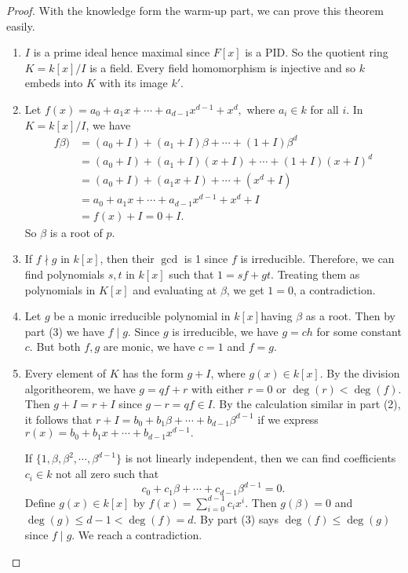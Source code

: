 \documentclass[12pt]{report}
\theoremstyle{definition}
\begin{document}
\begin{proof}
	With the knowledge form the warm-up part, we can prove this theorem easily.
	\begin{enumerate}
		\item  $I$ is a prime ideal hence maximal since $F[x]$ is a PID. So the quotient ring $K=k[x]/I$ is a field. Every field homomorphism is injective and so $k$ embeds into $K$ with its image $k'$.
		\item Let $f(x)= a_0+a_1x+\cdots+a_{d-1}x^{d-1}+x^d,$ where $a_i\in k$ for all $i$. In $K=k[x]/I$, we have \begin{align*}
			      f\beta) & = (a_0+I)+(a_1+I)\beta+\cdots+(1+I)\beta^d \\
			              & = (a_0+I)+(a_1+I)(x+I)+\cdots+(1+I)(x+I)^d \\
			              & = (a_0+I)+(a_1x+I)+\cdots+(x^d +I)         \\
			              & = a_0+a_1x+\cdots+a_{d-1}x^{d-1}+x^d +I    \\
			              & = f(x)+I = 0+I.
		      \end{align*} So $\beta$ is a root of $p$.
		\item If $f\nmid g$ in $k[x]$, then their $\gcd$ is 1 since $f$ is irreducible. Therefore, we can find polynomials $s,t$ in $k[x]$ such that $1=sf+gt$. Treating them as polynomials in $K[x]$ and evaluating at $\beta$, we get $1=0$, a contradiction.
		\item Let $g$ be a monic irreducible polynomial in $k[x]$having $\beta$ as a root. Then by part (3) we have $f\mid g$. Since $g$ is irreducible, we have $g=ch$ for some constant $c$. But both $f,g$ are monic, we have $c=1$ and $f=g$.
		\item Every element of $K$ has the form $g+I$, where $g(x)\in k[x]$. By the division algoritheorem, we have $g=qf+r$ with either $r=0$ or $\deg(r)<\deg(f)$. Then $g+I=r+I$ since $g-r=qf\in I$. By the calculation similar in part (2), it follows that $r+I = b_0+b_1\beta+\cdots+ b_{d-1} \beta^{d-1}$ if we express $r(x)= b_0+b_1 x+\cdots+b_{d-1}x^{d-1}.$

		      If $\{1,\beta,\beta^2,\cdots,\beta^{d-1}\}$ is not linearly independent, then we can find coefficients $c_i\in k$ not all zero such that $$c_0+c_1\beta+\cdots+c_{d-1}\beta^{d-1}=0.$$ Define $g(x)\in k[x]$ by $f(x)=\sum_{i=0}^{d-1}c_ix^i$. Then $g(\beta)=0$ and $\deg(g)\leq d-1 <\deg(f)=d$. By part (3) says $\deg(f)\leq \deg(g)$ since $f\mid g$. We reach a contradiction.
	\end{enumerate}
\end{proof}
\end{document}
